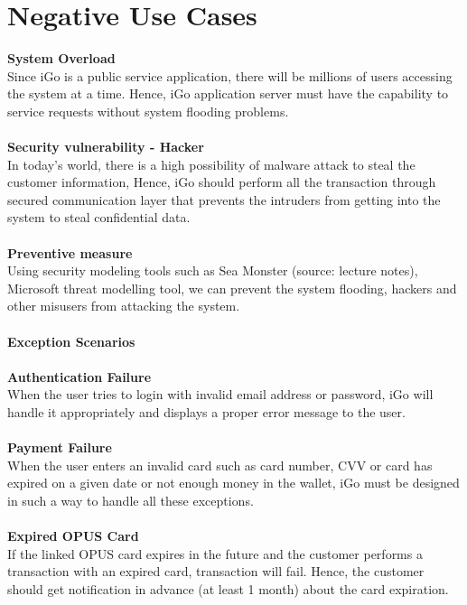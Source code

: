\documentclass[a4paper, 11pt]{report}
\begin{document}
{\section{Negative Use Cases}
 \large{\textbf{System Overload}}\\
 Since iGo is a public service application, there will be millions of users accessing the system at a time. Hence, iGo application server must have the capability to service requests without system flooding problems. \\\\
 \large{\textbf{Security vulnerability - Hacker}}\\
 In today's world, there is a high possibility of malware attack to steal the customer information, Hence, iGo should perform all the transaction through secured communication layer that prevents the intruders from getting into the system to steal confidential data.\\\\
 \large{\textbf{Preventive measure}}\\
 Using security modeling tools such as Sea Monster (source: lecture notes), Microsoft threat modelling tool, we can prevent the system flooding, hackers and other misusers from attacking the system. \\\\
 \large{\textbf{Exception Scenarios}}\\\\
 \large{\textbf{Authentication Failure}}\\
 When the user tries to login with invalid email address or password, iGo will handle it appropriately and displays a proper error message to the user.\\\\
 \large{\textbf{Payment Failure}}\\
 When the user enters an invalid card such as card number, CVV or card has expired on a given date or not enough money in the wallet, iGo must be designed in such a way to handle all these exceptions.\\\\
 \large{\textbf{Expired OPUS Card}}\\
 If the linked OPUS card expires in the future and the customer performs a transaction with an expired card, transaction will fail. Hence, the customer should get notification in advance (at least 1 month) about the card expiration.
}
\end{document}
